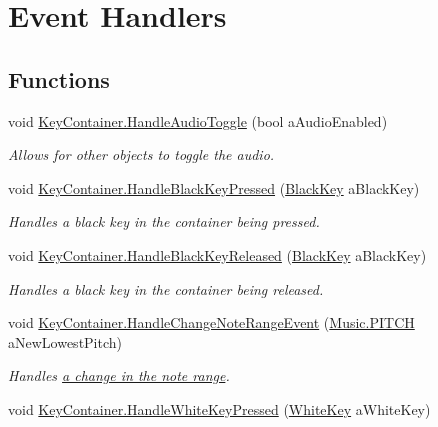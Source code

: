 \hypertarget{group___key_contain_event_handlers}{}\section{Event Handlers}
\label{group___key_contain_event_handlers}
\subsection*{Functions}
\begin{DoxyCompactItemize}
\item 
void \hyperlink{group___key_contain_event_handlers_ga5fc6752f438bda64f0f860da0788fc13}{Key\+Container.\+Handle\+Audio\+Toggle} (bool a\+Audio\+Enabled)
\begin{DoxyCompactList}\small\item\em Allows for other objects to toggle the audio. \end{DoxyCompactList}\item 
void \hyperlink{group___key_contain_event_handlers_ga05cc2543fd9772b26e27bf4f6247ab47}{Key\+Container.\+Handle\+Black\+Key\+Pressed} (\hyperlink{class_black_key}{Black\+Key} a\+Black\+Key)
\begin{DoxyCompactList}\small\item\em Handles a black key in the container being pressed. \end{DoxyCompactList}\item 
void \hyperlink{group___key_contain_event_handlers_ga5a0c5565c5ebc6026b3122f487e51704}{Key\+Container.\+Handle\+Black\+Key\+Released} (\hyperlink{class_black_key}{Black\+Key} a\+Black\+Key)
\begin{DoxyCompactList}\small\item\em Handles a black key in the container being released. \end{DoxyCompactList}\item 
void \hyperlink{group___key_contain_event_handlers_ga0d82098e4f886f77a33f9d5ed13fe195}{Key\+Container.\+Handle\+Change\+Note\+Range\+Event} (\hyperlink{group___music_enums_ga508f69b199ea518f935486c990edac1d}{Music.\+P\+I\+T\+CH} a\+New\+Lowest\+Pitch)
\begin{DoxyCompactList}\small\item\em Handles \hyperlink{group___v_i_m_event_types_class_virtual_instrument_manager_1_1_change_note_range_event}{a change in the note range}. \end{DoxyCompactList}\item 
void \hyperlink{group___key_contain_event_handlers_ga4e2c5e8be389a7514429910e7d61f028}{Key\+Container.\+Handle\+White\+Key\+Pressed} (\hyperlink{class_white_key}{White\+Key} a\+White\+Key)

\end{DoxyCompactItemize}
